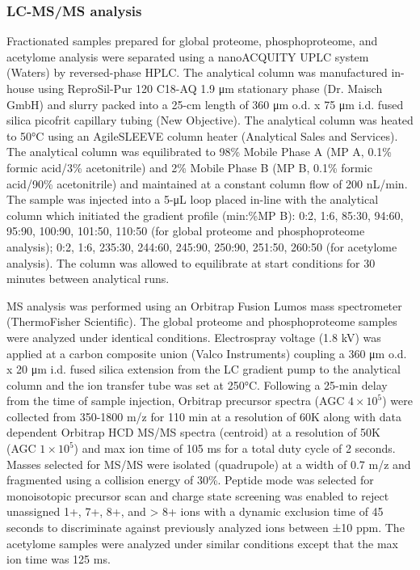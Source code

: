 \subsubsection{LC-MS/MS analysis}
Fractionated samples prepared for global proteome, phosphoproteome, and acetylome analysis were separated using a nanoACQUITY UPLC system (Waters) by reversed-phase HPLC. The analytical column was manufactured in-house using ReproSil-Pur 120 C18-AQ 1.9 μm stationary phase (Dr. Maisch GmbH) and slurry packed into a 25-cm length of 360 μm o.d. x 75 μm i.d. fused silica picofrit capillary tubing (New Objective). The analytical column was heated to 50°C using an AgileSLEEVE column heater (Analytical Sales and Services). The analytical column was equilibrated to 98\% Mobile Phase A (MP A, 0.1\% formic acid/3\% acetonitrile) and 2\% Mobile Phase B (MP B, 0.1\% formic acid/90\% acetonitrile) and maintained at a constant column flow of 200 nL/min. The sample was injected into a 5-μL loop placed in-line with the analytical column which initiated the gradient profile (min:\%MP B): 0:2, 1:6, 85:30, 94:60, 95:90, 100:90, 101:50, 110:50 (for global proteome and phosphoproteome analysis); 0:2, 1:6, 235:30, 244:60, 245:90, 250:90, 251:50, 260:50 (for acetylome analysis). The column was allowed to equilibrate at start conditions for 30 minutes between analytical runs.

MS analysis was performed using an Orbitrap Fusion Lumos mass spectrometer (ThermoFisher Scientific). The global proteome and phosphoproteome samples were analyzed under identical conditions. Electrospray voltage (1.8 kV) was applied at a carbon composite union (Valco Instruments) coupling a 360 μm o.d. x 20 μm i.d. fused silica extension from the LC gradient pump to the analytical column and the ion transfer tube was set at 250°C. Following a 25-min delay from the time of sample injection, Orbitrap precursor spectra (AGC $4 \times 10^5$) were collected from 350-1800 m/z for 110 min at a resolution of 60K along with data dependent Orbitrap HCD MS/MS spectra (centroid) at a resolution of 50K (AGC $1 \times 10^5$) and max ion time of 105 ms for a total duty cycle of 2 seconds. Masses selected for MS/MS were isolated (quadrupole) at a width of 0.7 m/z and fragmented using a collision energy of 30\%. Peptide mode was selected for monoisotopic precursor scan and charge state screening was enabled to reject unassigned 1+, 7+, 8+, and > 8+ ions with a dynamic exclusion time of 45 seconds to discriminate against previously analyzed ions between ±10 ppm. The acetylome samples were analyzed under similar conditions except that the max ion time was 125 ms.

